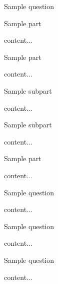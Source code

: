 \documentclass[11pt]{article} %
\begin{document}
	\renewcommand*{\qpoints}{10} %
	\renewcommand*{\coursecode}{MATH xxx} %
	\renewcommand*{\assgnnumber}{Assignment \#00} %
	\renewcommand*{\submdate}{00 MONTH 2019} %
	\renewcommand*{\studentfname}{FName} %
	\renewcommand*{\studentlname}{LName} %
	\renewcommand*{\studentnum}{SNumber} %
	\setfigpath
	\pagestyle{crowdmark}
	\fancyhfoffset[L,O]{0pt} %
\begin{qstn}[1] %
	Sample question
\begin{assgnenum}
	\qitem Sample part
	\begin{soln}
		content...
	\end{soln}
	\qitem Sample part
	\begin{soln}
		content...
	\end{soln}
	\begin{assgnenum}
		\qitem Sample subpart
		\begin{soln}
			content...
		\end{soln}
		\qitem Sample subpart
		\begin{soln}
			content...
		\end{soln}
	\end{assgnenum}
		\qitem Sample part
	\begin{soln}
		content...
	\end{soln}
\end{assgnenum}
\end{qstn}

\begin{qstn}[2]
	Sample question
\begin{soln}
	content...
\end{soln}
\end{qstn}

\begin{qstn}[3]
	Sample question
\begin{soln}
	content...
\end{soln}
\end{qstn}

\begin{qstn}[4]
	Sample question
\begin{soln}
	content...
\end{soln}
\end{qstn}
\end{document}
